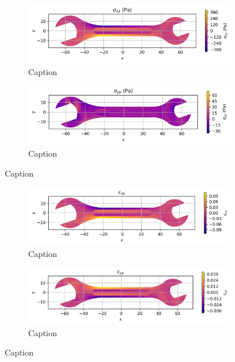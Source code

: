 \begin{figure}[H]
  \centering
  \begin{subfigure}[t]{0.49\textwidth}
    \centering
    \includegraphics[width=\textwidth]{GRAFICOS/Case c - sigma_xx.png}
    \caption{Caption}
    \label{fig:deformada_reacciones}
  \end{subfigure}
  \hfill
  \begin{subfigure}[t]{0.49\textwidth}
    \centering
    \includegraphics[width=\textwidth]{GRAFICOS/Case c - sigma_yy.png}
    \caption{Caption}
    \label{fig:von_mises}
  \end{subfigure}
  \caption{Caption}
  \label{fig:analisis_estructural}
\end{figure}

\begin{figure}[H]
  \centering
  \begin{subfigure}[t]{0.49\textwidth}
    \centering
    \includegraphics[width=\textwidth]{GRAFICOS/Case c - epsilon_xx.png}
    \caption{Caption}
    \label{fig:deformada_reacciones}
  \end{subfigure}
  \hfill
  \begin{subfigure}[t]{0.49\textwidth}
    \centering
    \includegraphics[width=\textwidth]{GRAFICOS/Case c - epsilon_yy.png}
    \caption{Caption}
    \label{fig:von_mises}
  \end{subfigure}
  \caption{Caption}
  \label{fig:analisis_estructural}
\end{figure}


